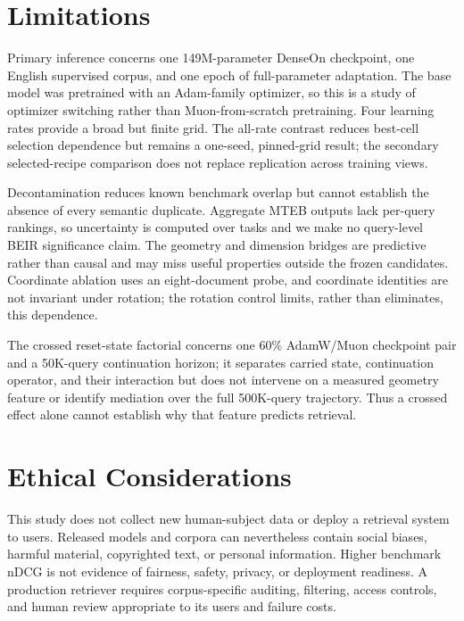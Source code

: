 \documentclass[11pt]{article}
\begin{document}
\label{paper-main-end}

\section{Limitations}

Primary inference concerns one 149M-parameter DenseOn checkpoint, one English supervised corpus,
and one epoch of full-parameter adaptation. The base model was pretrained with an Adam-family
optimizer, so this is a study of optimizer switching rather than Muon-from-scratch pretraining.
Four learning rates provide a broad but finite grid. The all-rate contrast reduces best-cell
selection dependence but remains a one-seed, pinned-grid result; the secondary selected-recipe
comparison does not replace replication across training views.

Decontamination reduces known benchmark overlap but cannot establish the absence of every semantic
duplicate. Aggregate MTEB outputs lack per-query rankings, so uncertainty is computed over tasks and
we make no query-level BEIR significance claim. The geometry and dimension bridges are predictive
rather than causal and may miss useful properties outside the frozen candidates. Coordinate
ablation uses an eight-document probe, and coordinate identities are not invariant under rotation;
the rotation control limits, rather than eliminates, this dependence.

The crossed reset-state factorial concerns one 60\% AdamW/Muon checkpoint pair and a 50K-query
continuation horizon; it separates carried state, continuation operator, and their interaction but
does not intervene on a measured geometry feature or identify mediation over the full 500K-query
trajectory. Thus a crossed effect alone cannot establish why that feature predicts retrieval.

\section{Ethical Considerations}

This study does not collect new human-subject data or deploy a retrieval system to users. Released
models and corpora can nevertheless contain social biases, harmful material, copyrighted text, or
personal information. Higher benchmark nDCG is not evidence of fairness, safety, privacy, or
deployment readiness. A production retriever requires corpus-specific auditing, filtering, access
controls, and human review appropriate to its users and failure costs.
\end{document}
